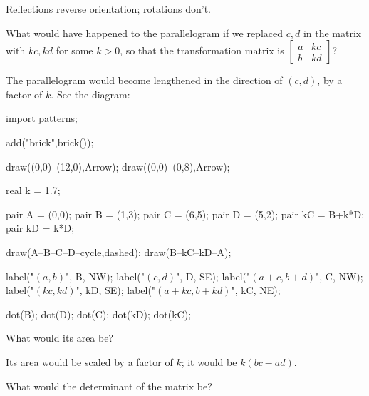 \documentclass[../key.tex]{subfiles}
\begin{document}
Reflections reverse orientation; rotations don't.

\begin{inner_problem}
\item
\end{inner_problem}

\begin{iinner_problem}[start=1]
\item What would have happened to the parallelogram if we replaced $c,d$ in the matrix with $kc,kd$ for some $k>0$, so that the transformation matrix is $\left[\begin{smallmatrix} a & kc \\ b & kd \end{smallmatrix}\right]$?
\end{iinner_problem}

The parallelogram would become lengthened in the direction of $(c,d)$, by a factor of $k$. See the diagram:

\begin{center}
	\begin{asy}[width=0.4\textwidth]
	import patterns;

	add("brick",brick());

	draw((0,0)--(12,0),Arrow);
	draw((0,0)--(0,8),Arrow);

	real k = 1.7;

	pair A = (0,0);
	pair B = (1,3);
	pair C = (6,5);
	pair D = (5,2);
	pair kC = B+k*D;
	pair kD = k*D;

	draw(A--B--C--D--cycle,dashed);
	draw(B--kC--kD--A);

	label("$(a,b)$", B, NW);
	label("$(c,d)$", D, SE);
	label("$(a+c,b+d)$", C, NW);
	label("$(kc,kd)$", kD, SE);
	label("$(a+kc,b+kd)$", kC, NE);

	dot(B);
	dot(D);
	dot(C);
	dot(kD);
	dot(kC);

	\end{asy}
\end{center}

\begin{iinner_problem}
\item What would its area be?
\end{iinner_problem}

Its area would be scaled by a factor of $k$; it would be $k(bc-ad)$.

\begin{iinner_problem}
\item What would the determinant of the matrix be?
\end{iinner_problem}
\end{document}
